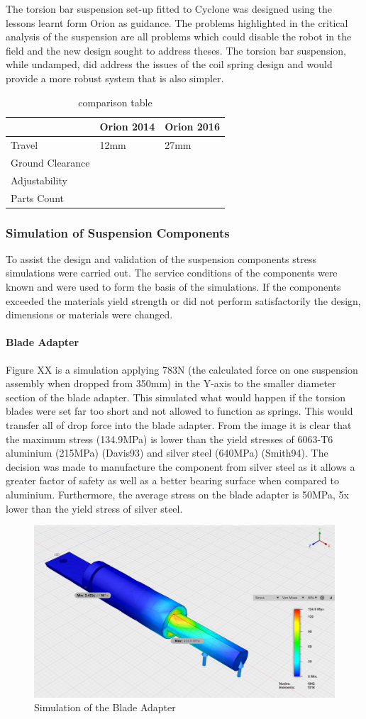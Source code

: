 The torsion bar suspension set-up fitted to Cyclone was designed using the lessons learnt form Orion as guidance. The problems highlighted in the critical analysis of the suspension are all problems which could disable the robot in the field and the new design sought to address theses. The torsion bar suspension, while undamped, did address the issues of the coil spring design and would provide a more robust system that is also simpler. 

\begin{table}[h]
\begin{tabular}{l l l}
\hline
\textbf{} & \textbf{Orion 2014} & \textbf{Orion 2016}\\
\hline
Travel & 12mm & 27mm\\
Ground Clearance & & \\
Adjustability & & \\
Parts Count & & \\
\hline
\end{tabular}
\caption{comparison table}
\end{table}

\subsubsection{Simulation of Suspension Components}

To assist the design and validation of the suspension components stress simulations were carried out. The service conditions of the components were known and were used to form the basis of the simulations. If the components exceeded the materials yield strength or did not perform satisfactorily the design, dimensions or materials were changed.

\paragraph{Blade Adapter}

Figure XX is a simulation applying 783N (the calculated force on one suspension assembly when dropped from 350mm) in the Y-axis to the smaller diameter section of the blade adapter. This simulated what would happen if the torsion blades were set far too short and not allowed to function as springs. This would transfer all of drop force into the blade adapter. From the image it is clear that the maximum stress (134.9MPa) is lower than the yield stresses of 6063-T6 aluminium (215MPa) (Davis93) and silver steel (640MPa) (Smith94). The decision was made to manufacture the component from silver steel as it allows a greater factor of safety as well as a better bearing surface when compared to aluminium. Furthermore, the average stress on the blade adapter is 50MPa, 5x lower than the yield stress of silver steel.

\begin{figure}[h]
\centering\includegraphics[width=0.6\linewidth]{Images/MaxImages/BladeAdapterSim.png}
\caption{Simulation of the Blade Adapter}
\label{fig:BladeAdapterSim}
\end{figure}